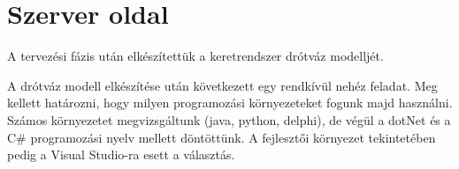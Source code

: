 \documentclass{thesis-ekf}
\theoremstyle{definition}
\theoremstyle{remark}
\begin{document}
\section{Szerver oldal} 
A tervezési fázis után elkészítettük a keretrendszer drótváz modelljét. 
\par A drótváz modell elkészítése után következett egy rendkívül nehéz feladat. Meg kellett határozni, hogy milyen programozási környezeteket fogunk majd használni. Számos környezetet megvizsgáltunk (java, python, delphi), de  végül a dotNet és a C\# programozási nyelv mellett döntöttünk. A fejlesztői környezet tekintetében pedig a Visual Studio-ra esett a választás. 
\end{document}
